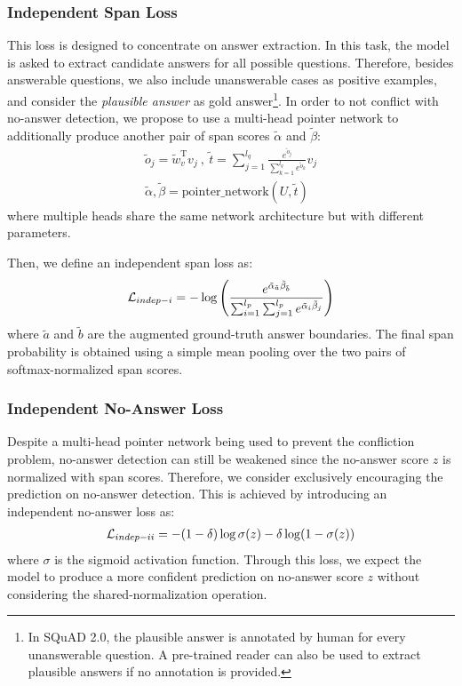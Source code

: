 \documentclass[letterpaper]{article} \usepackage{aaai19}  \usepackage{times}  \usepackage{helvet}  \usepackage{courier}  \usepackage{url}  \usepackage{graphicx}  \usepackage{pbox}
\begin{document}
\subsubsection{Independent Span Loss}
This loss is designed to concentrate on answer extraction.  
In this task, the model is asked to extract candidate answers for all possible questions. 
Therefore, besides answerable questions, we also include unanswerable cases as positive examples, and consider the \emph{plausible answer} as gold answer\footnote{In SQuAD 2.0, the plausible answer is annotated by human for every unanswerable question. A pre-trained reader can also be used to extract plausible answers if no annotation is provided.}.
In order to not conflict with no-answer detection, we propose to use a multi-head pointer network to additionally produce another pair of span scores $\tilde{\alpha}$ and $\tilde{\beta}$:
\begin{gather}
	\tilde{o}_{j} = \tilde{w}_v^ \mathrm{ T } v_j  \ , \
	\tilde{t}=\sum_{j=1}^{l_q} \frac{e^{\tilde{o}_{j}}}{\sum_{k=1}^{l_q} e^{\tilde{o}_{k}}} v_j \nonumber \\
    \tilde{\alpha}, \tilde{\beta} = \mathrm{pointer\_network}(U, \tilde{t})	\nonumber
\end{gather}
where multiple heads share the same network architecture but with different parameters. 

Then, we define an independent span loss as:
\begin{eqnarray} 
	\mathcal{L}_{indep-\uppercase\expandafter{\romannumeral1}} = - \log \left( \frac{ e^{ \tilde{\alpha}_{\tilde{a}} \tilde{\beta}_{\tilde{b}} } }{\sum_{i=1}^{l_p} \sum_{j=1}^{l_p} e^{\tilde{\alpha}_i \tilde{\beta}_j}} \right)	\nonumber
\end{eqnarray}
where $\tilde{a}$ and $\tilde{b}$ are the augmented ground-truth answer boundaries. The final span probability is obtained using a simple mean pooling over the two pairs of softmax-normalized span scores.

\subsubsection{Independent No-Answer Loss}
Despite a multi-head pointer network being used to prevent the confliction problem, no-answer detection can still be weakened since the no-answer score $z$ is normalized with span scores.
Therefore, we consider exclusively encouraging the prediction on no-answer detection.
This is achieved by introducing an independent no-answer loss as:
\begin{eqnarray} 
	\mathcal{L}_{indep-\uppercase\expandafter{\romannumeral2}} = - (1 - \delta) \log \sigma(z) - \delta \log(1 - \sigma(z))	\nonumber
\end{eqnarray}
where $\sigma$ is the sigmoid activation function. 
Through this loss, we expect the model to produce a more confident prediction on no-answer score $z$ without considering the shared-normalization operation.
\end{document}
